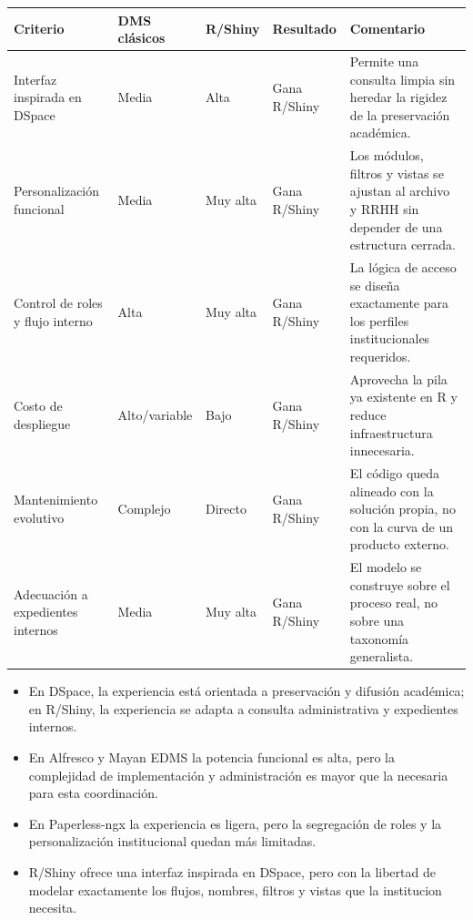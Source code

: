 \begingroup
\small
\setlength{\tabcolsep}{3pt}
\renewcommand{\arraystretch}{1.15}
\begin{center}
\begin{tabularx}{\textwidth}{@{}p{} p{} p{} p{} X@{}}
\toprule
\textbf{Criterio} & \textbf{DMS clásicos} & \textbf{R/Shiny} & \textbf{Resultado} & \textbf{Comentario} \\
\midrule
Interfaz inspirada en DSpace & Media & Alta & Gana R/Shiny & Permite una consulta limpia sin heredar la rigidez de la preservación académica. \\
Personalización funcional & Media & Muy alta & Gana R/Shiny & Los módulos, filtros y vistas se ajustan al archivo y RRHH sin depender de una estructura cerrada. \\
Control de roles y flujo interno & Alta & Muy alta & Gana R/Shiny & La lógica de acceso se diseña exactamente para los perfiles institucionales requeridos. \\
Costo de despliegue & Alto/variable & Bajo & Gana R/Shiny & Aprovecha la pila ya existente en R y reduce infraestructura innecesaria. \\
Mantenimiento evolutivo & Complejo & Directo & Gana R/Shiny & El código queda alineado con la solución propia, no con la curva de un producto externo. \\
Adecuación a expedientes internos & Media & Muy alta & Gana R/Shiny & El modelo se construye sobre el proceso real, no sobre una taxonomía generalista. \\
\bottomrule
\end{tabularx}
\end{center}
\endgroup

\begin{itemize}
  \item En DSpace, la experiencia está orientada a preservación y difusión académica; en R/Shiny, la experiencia se adapta a consulta administrativa y expedientes internos.
  \item En Alfresco y Mayan EDMS la potencia funcional es alta, pero la complejidad de implementación y administración es mayor que la necesaria para esta coordinación.
  \item En Paperless-ngx la experiencia es ligera, pero la segregación de roles y la personalización institucional quedan más limitadas.
  \item R/Shiny ofrece una interfaz inspirada en DSpace, pero con la libertad de modelar exactamente los flujos, nombres, filtros y vistas que la institucion necesita.
\end{itemize}

